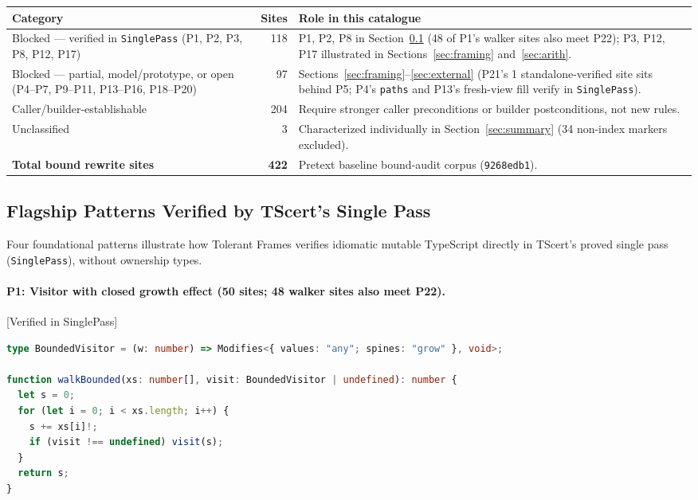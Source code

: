 \documentclass[10pt,a4paper]{article}
\newcommand{\code}[1]{\textcolor{codec}{\texttt{#1}}}
\newcommand{\lean}[1]{\texttt{\small #1}}
\newcommand{\status}[1]{\textcolor{leanc}{\textsf{\small[#1]}}}
\renewcommand{\lean}[1]{\textcolor{leanc}{\texttt{\small #1}}}%
\begin{document}
\begin{center}\small
\begin{tabularx}{\textwidth}{@{} >{\raggedright\arraybackslash}p{} r >{\raggedright\arraybackslash}X@{}}
\toprule
Category & Sites & Role in this catalogue\\
\midrule
Blocked --- verified in \lean{SinglePass} (P1, P2, P3, P8, P12, P17) & 118 & P1, P2, P8 in Section~\ref{sec:verified} (48 of P1's walker sites also meet P22); P3, P12, P17 illustrated in Sections~\ref{sec:framing} and~\ref{sec:arith}.\\
Blocked --- partial, model/prototype, or open (P4--P7, P9--P11, P13--P16, P18--P20) & 97 & Sections~\ref{sec:framing}--\ref{sec:external} (P21's 1 standalone-verified site sits behind P5; P4's \code{paths} and P13's fresh-view fill verify in \lean{SinglePass}).\\
Caller/builder-establishable & 204 & Require stronger caller preconditions or builder postconditions, not new rules.\\
Unclassified & 3 & Characterized individually in Section~\ref{sec:summary} (34 non-index markers excluded).\\
\midrule
\textbf{Total bound rewrite sites} & \textbf{422} & Pretext baseline bound-audit corpus (\code{9268edb1}).\\
\bottomrule
\end{tabularx}
\end{center}

\subsection{Flagship Patterns Verified by TScert's Single Pass}\label{sec:verified}

Four foundational patterns illustrate how Tolerant Frames verifies
idiomatic mutable TypeScript directly in TScert's proved single pass
(\lean{SinglePass}), without ownership types.

\paragraph{P1: Visitor with closed growth effect (50 sites; 48 walker sites also meet P22).}
\status{Verified in SinglePass}

\begin{lstlisting}[language=TypeScript]
type BoundedVisitor = (w: number) => Modifies<{ values: "any"; spines: "grow" }, void>;

function walkBounded(xs: number[], visit: BoundedVisitor | undefined): number {
  let s = 0;
  for (let i = 0; i < xs.length; i++) {
    s += xs[i]!;
    if (visit !== undefined) visit(s);
  }
  return s;
}
\end{lstlisting}
\end{document}
